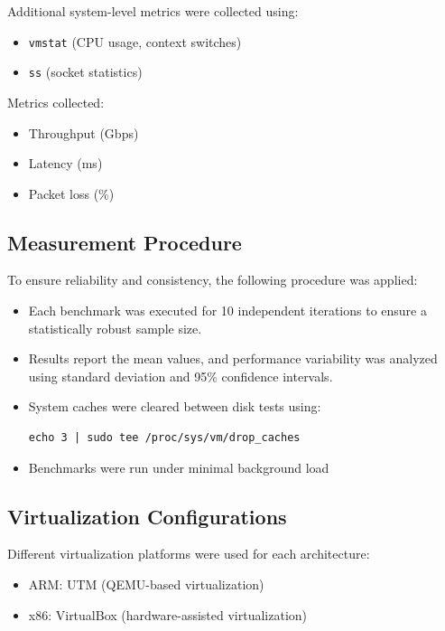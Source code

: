 \documentclass[conference]{IEEEtran}
\begin{document}
Additional system-level metrics were collected using:
\begin{itemize}
    \item \texttt{vmstat} (CPU usage, context switches)
    \item \texttt{ss} (socket statistics)
\end{itemize}

Metrics collected:
\begin{itemize}
    \item Throughput (Gbps)
    \item Latency (ms)
    \item Packet loss (\%)
\end{itemize}

\subsection{Measurement Procedure}

To ensure reliability and consistency, the following procedure was applied:

\begin{itemize}
    \item Each benchmark was executed for 10 independent iterations to ensure a statistically robust sample size.
    \item Results report the mean values, and performance variability was analyzed using standard deviation and 95\% confidence intervals.
    \item System caches were cleared between disk tests using:
    \begin{verbatim}
echo 3 | sudo tee /proc/sys/vm/drop_caches
    \end{verbatim}
    \item Benchmarks were run under minimal background load
\end{itemize}

\subsection{Virtualization Configurations}

Different virtualization platforms were used for each architecture:

\begin{itemize}
    \item ARM: UTM (QEMU-based virtualization)
    \item x86: VirtualBox (hardware-assisted virtualization)
\end{itemize}
\end{document}
